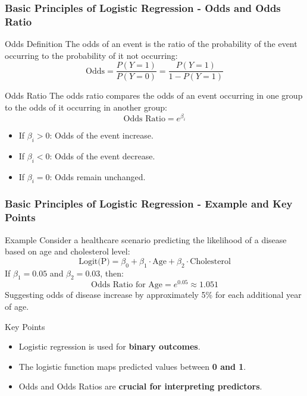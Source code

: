 \documentclass[aspectratio=169]{beamer}
\begin{document}
\begin{frame}[fragile]
    \frametitle{Basic Principles of Logistic Regression - Odds and Odds Ratio}
    \begin{block}{Odds Definition}
        The odds of an event is the ratio of the probability of the event occurring to the probability of it not occurring:
        \begin{equation}
            \text{Odds} = \frac{P(Y=1)}{P(Y=0)} = \frac{P(Y=1)}{1 - P(Y=1)}
        \end{equation}
    \end{block}

    \begin{block}{Odds Ratio}
        The odds ratio compares the odds of an event occurring in one group to the odds of it occurring in another group:
        \begin{equation}
            \text{Odds Ratio} = e^{\beta_i}
        \end{equation}
        \begin{itemize}
            \item If $\beta_i > 0$: Odds of the event increase.
            \item If $\beta_i < 0$: Odds of the event decrease.
            \item If $\beta_i = 0$: Odds remain unchanged.
        \end{itemize}
    \end{block}
\end{frame}

\begin{frame}[fragile]
    \frametitle{Basic Principles of Logistic Regression - Example and Key Points}
    \begin{block}{Example}
        Consider a healthcare scenario predicting the likelihood of a disease based on age and cholesterol level:
        \begin{equation}
            \text{Logit(P)} = \beta_0 + \beta_1 \cdot \text{Age} + \beta_2 \cdot \text{Cholesterol} 
        \end{equation}
        If $\beta_1 = 0.05$ and $\beta_2 = 0.03$, then:
        \begin{equation}
            \text{Odds Ratio for Age} = e^{0.05} \approx 1.051  
        \end{equation}
        Suggesting odds of disease increase by approximately 5\% for each additional year of age.
    \end{block}

    \begin{block}{Key Points}
        \begin{itemize}
            \item Logistic regression is used for \textbf{binary outcomes}.
            \item The logistic function maps predicted values between \textbf{0 and 1}.
            \item Odds and Odds Ratios are \textbf{crucial for interpreting predictors}.
        \end{itemize}
    \end{block}
\end{frame}
\end{document}
